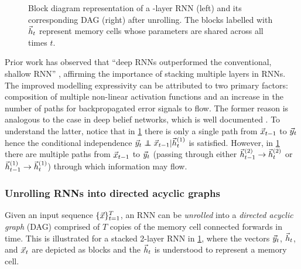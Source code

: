 \begin{figure}[tb]
    \centering
    \resizebox{4.5in}{!}{}
    \caption{Block diagram representation of a -layer RNN (left) and its
    corresponding DAG (right) after unrolling. The blocks labelled
    with $\vec{h}_t$ represent memory cells whose parameters are shared across all times
  $t$.}
    \label{fig:rnn-multi-unrolled}
\end{figure}

Prior work has observed that ``deep RNNs outperformed the conventional, shallow RNN''
\citet{pascanu2013construct}, affirming the importance of stacking multiple layers
in RNNs. The improved modelling expressivity can be attributed to two primary
factors: composition of multiple non-linear activation functions and an
increase in the number of paths for backpropagated error signals to flow. The
former reason is analogous to the case in deep belief networks, which is well
documented \citep{bengio2009learning}. To understand the latter, notice that in
\cref{fig:rnn-multi-unrolled} there is only a single path from $\vec{x}_{t-1}$ to
$\vec{y}_{t}$ hence the conditional independence $\y_{t} \independent \x_{t-1} |
\h^{(1)}_t$ is satisfied. However, in \cref{fig:rnn-multi-unrolled} there are
multiple paths from $\vec{x}_{t-1}$ to $\vec{y}_{t}$ (\eg passing through either
$\vec{h}^{(2)}_{t-1} \to \vec{h}^{(2)}_t$ or $\vec{h}^{(1)}_{t-1} \to \vec{h}^{(1)}_t$) through
which information may flow.

\subsubsection{Unrolling RNNs into directed acyclic graphs}


Given an input sequence $\{\vec{x}\}_{t=1}^T$, an RNN can be \emph{unrolled} into a
\emph{directed acyclic graph} (DAG) comprised of $T$ copies of the memory cell
connected forwards in time. This is illustrated for a stacked 2-layer RNN in
\cref{fig:rnn-multi-unrolled}, where the vectors $\vec{y}_t$, $\vec{h}_t$, and $\vec{x}_t$ are
depicted as blocks and the $\vec{h}_t$ is understood to represent a memory cell.



